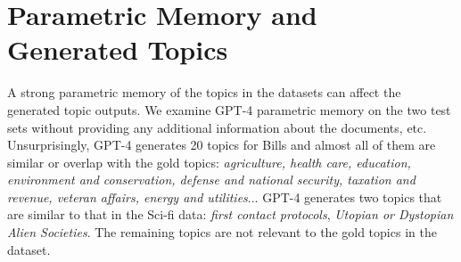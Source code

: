 
\section{Parametric Memory and Generated Topics}
\label{sec:parametric}
A strong parametric memory of the topics in the datasets can affect the generated topic outputs. 
%
We examine GPT-4 parametric memory on the two test sets without providing any additional information about the documents, etc.
%
Unsurprisingly, GPT-4 generates 20 topics for  Bills and almost all of them are similar or overlap with the gold topics: \textit{agriculture, health care, education, environment and conservation, defense and national security, taxation and revenue, veteran affairs, energy and utilities}...
%
GPT-4 generates two topics that are similar to that in the Sci-fi data: \textit{first contact protocols}, \textit{Utopian or Dystopian Alien Societies}.
%
The remaining topics are not relevant to the gold topics in the dataset.


